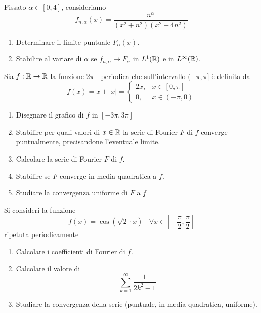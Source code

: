 Fissato $\alpha \in [ 0, 4]$, consideriamo
\begin{equation*}
f_{n, \alpha}(x) = \frac{n^{\alpha}}{\left(x^{2} + n^{2}\right)\left(x^{2} + 4n^{2}\right)}
\end{equation*}
\begin{enumerate}
\item Determinare il limite puntuale $F_{\alpha}(x)$.
\item Stabilire al variare di $\alpha $ se $f_{n, \alpha}\rightarrow F_{\alpha}$ in $L^{1}(\mathbb{R})$ e in $L^{\infty}(\mathbb{R})$.
\end{enumerate}
\Esercizio{}

Sia $f:\mathbb{R} \rightarrow \mathbb{R} $ la funzione $2\pi $ - periodica che sull'intervallo $(- \pi, \pi ]$ è definita da
\begin{equation*}
f(x) = x + | x| =
\begin{cases}
2x, & x\in [ 0, \pi ]\\
0, & x\in (- \pi, 0)
\end{cases}
\end{equation*}
\begin{enumerate}
\item Disegnare il grafico di $f$ in $[ - 3\pi, 3\pi ]$
\item Stabilire per quali valori di $x\in \mathbb{R} $ la serie di Fourier $F$ di $f$ converge puntualmente, precisandone l'eventuale limite.
\item Calcolare la serie di Fourier $F$ di $f$.
\item Stabilire se $F$ converge in media quadratica a $f$.
\item Studiare la convergenza uniforme di $F$ a $f$
\end{enumerate}
\Esercizio{}

Si consideri la funzione
\begin{equation*}
f(x) = \cos\left(\sqrt{2} \cdot x\right) \ \ \ \ \forall x\in \left[ - \frac{\pi}{2}, \frac{\pi}{2}\right]
\end{equation*}
ripetuta periodicamente
\begin{enumerate}
\item Calcolare i coefficienti di Fourier di $f$.
\item Calcolare il valore di
\begin{equation*}
\sum\limits^{\infty}_{k = 1}\frac{1}{2k^{2} - 1}
\end{equation*}
\item Studiare la convergenza della serie (puntuale, in media quadratica, uniforme).
\end{enumerate}
\ParteSoluzioni
\Soluzione


